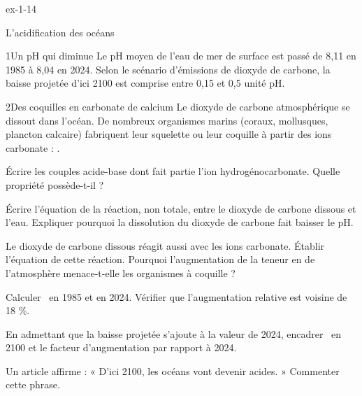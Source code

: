 \begin{blocLivre}{ex-1-14}
\begin{exercice}[3]{L'acidification des océans}
\begin{docu}{1}{Un pH qui diminue}
Le pH moyen de l'eau de mer de surface est passé de 8,11 en 1985 à 8,04 en 2024. Selon le scénario
d'émissions de dioxyde de carbone, la baisse projetée d'ici 2100 est comprise entre 0,15 et 0,5 unité pH.
\end{docu}
\begin{docu}{2}{Des coquilles en carbonate de calcium}
Le dioxyde de carbone atmosphérique se dissout dans l'océan. De nombreux organismes marins (coraux,
mollusques, plancton calcaire) fabriquent leur squelette ou leur coquille à partir des ions carbonate :
.
\end{docu}
\begin{questions}
\item Écrire les couples acide-base dont fait partie l'ion hydrogénocarbonate. Quelle propriété possède-t-il ?
\item Écrire l'équation de la réaction, non totale, entre le dioxyde de carbone dissous et l'eau.
Expliquer pourquoi la dissolution du dioxyde de carbone fait baisser le pH.
\item Le dioxyde de carbone dissous réagit aussi avec les ions carbonate. Établir l'équation de cette
réaction. Pourquoi l'augmentation de la teneur en  de l'atmosphère menace-t-elle les organismes à coquille ?
\item Calculer \hho\ en 1985 et en 2024. Vérifier que l'augmentation relative est voisine de 18 \%.
\item En admettant que la baisse projetée s'ajoute à la valeur de 2024, encadrer \hho\ en 2100
et le facteur d'augmentation par rapport à 2024.
\item Un article affirme : « D'ici 2100, les océans vont devenir acides. » Commenter cette phrase.
\end{questions}
\end{exercice}
\end{blocLivre}
